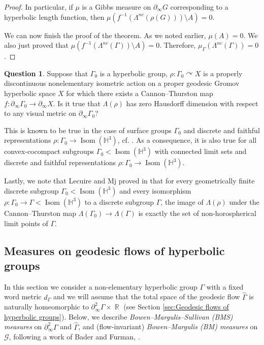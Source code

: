 \documentclass[12pt]{amsbook}%
\theoremstyle{definition}
\newtheorem{question}[thm]{Question}
\theoremstyle{remark}
\numberwithin{section}{chapter}
\numberwithin{subsection}{section}
\numberwithin{figure}{chapter}
\DeclareMathOperator{\Isom}{Isom}
\DeclareMathOperator{\acts}{\curvearrowright}
\DeclareMathOperator{\R}{\mathbb{R}}
\def\bH{{\mathbb{H}}}
\def\Ga{\Gamma}
\def\La{\Lambda}
\def\geo{\partial_\infty}
\def\cG{{\mathscr{G}}}
\begin{document}
{{\begin{proof}
In particular, if $\mu$ is a Gibbs measure on $\geo G$ corresponding to a hyperbolic length function, then 
$\mu(f^{-1}(\La^{nc}(\rho(G))) \setminus A)=0$.   

\medskip 
We can now finish the proof of the theorem. As we noted earlier, 
$\mu(A)=0$. We also just proved that $\mu(f^{-1}(\La^{nc}(\Ga)) \setminus A)=0$. 
Therefore, $\mu_\Ga(\La^{nc}(\Ga))=0$. 
\end{proof}


\begin{question} 
Suppose that $\Ga_0$ is a hyperbolic group, $\rho: \Ga_0\acts X$ is a properly discontinuous nonelementary isometric 
action on a proper geodesic Gromov hyperbolic space $X$ for which there exists a Cannon--Thurston map 
$f: \geo \Ga_0\to \geo X$. Is it true that $\La(\rho)$ has zero Hausdorff dimension 
with respect to any visual metric on $\geo \Ga_0$? %
\end{question}

This is known to be true in the case of surface groups $\Ga_0$ and discrete and faithful representations 
$\rho: \Ga_0\to \Isom(\bH^3)$, cf. \cite{Birman-Series}. As a consequence, it is also true for all convex-cocompact 
subgroups $\Ga_0< \Isom(\bH^3)$ with connected limit sets and discrete and faithful representations $\rho: \Ga_0\to \Isom(\bH^3)$. 

Lastly, we note that Lecuire and Mj proved in \cite{MR3801448} that for every geometrically finite discrete subgroup $\Ga_0< \Isom(\bH^3)$ and 
every isomorphism $\rho: \Ga_0\to \Ga< \Isom(\bH^3)$ to a discrete subgroup $\Ga$, the image of $\La(\rho)$ under the Cannon--Thurston map 
$\La(\Ga_0)\to \La(\Ga)$ is exactly the set of non-horospherical limit points of $\Ga$. 







\subsection{Measures on geodesic flows of hyperbolic groups}\label{sec:Measures on geodesic flows of hyperbolic groups}

In this section we consider a non-elementary hyperbolic group $\Gamma$ with a fixed word metric $d_\Ga$ and we will assume that the total space of the geodesic flow $\widehat\Ga$ is naturally homeomorphic to $\geo^2\Ga \times \R$ (see Section \ref{sec:Geodesic flows of hyperbolic groups}). Below, we describe {\em Bowen--Margulis--Sullivan (BMS) measures} on $\geo^2\Ga$ and $\widehat\Ga$, and (flow-invariant) {\em Bowen--Margulis (BM)  
measures} on $\cG$, following a work of Bader and Furman, \cite{BF}. 


}}
\end{document}
